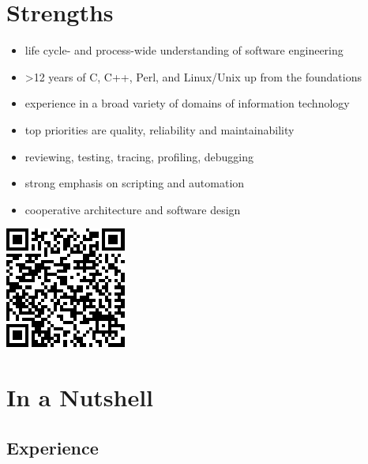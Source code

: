 \documentclass[a4paper,12pt]{article}
\newcommand{\compress}{\setlength\itemsep{-\parskip}}
\newenvironment{compressedItemize}{\begin{itemize}\compress}{\end{itemize}}
\begin{document}
\section{Strengths}

\begin{minipage}[b]{0.815\textwidth}
\begin{compressedItemize}
\item	life cycle- and process-wide understanding of software engineering
\item	>12 years of C, C++, Perl, and Linux/Unix up from the foundations
\item	experience in a broad variety of domains of information technology
\item	top priorities are quality, reliability and maintainability
\item	reviewing, testing, tracing, profiling, debugging
\item	strong emphasis on scripting and automation
\item	cooperative architecture and software design
\end{compressedItemize}
\end{minipage}
\parbox[t]{0.16\textwidth}{\includegraphics[scale=0.65,clip=false]{qrcode}}

\section{In a Nutshell}

\subsection*{Experience}
\end{document}
